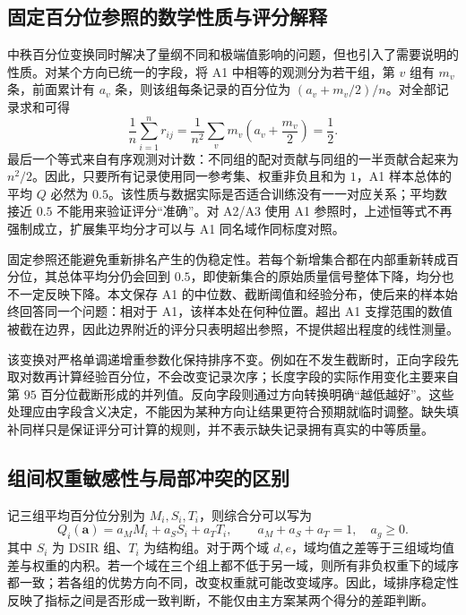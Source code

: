 \subsection{固定百分位参照的数学性质与评分解释}
中秩百分位变换同时解决了量纲不同和极端值影响的问题，但也引入了需要说明的性质。对某个方向已统一的字段，将 A1 中相等的观测分为若干组，第 $v$ 组有 $m_v$ 条，前面累计有 $a_v$ 条，则该组每条记录的百分位为 $(a_v+m_v/2)/n$。对全部记录求和可得
\begin{equation}
\frac{1}{n}\sum_{i=1}^{n}r_{ij}
=\frac{1}{n^2}\sum_v m_v\left(a_v+\frac{m_v}{2}\right)
=\frac12.
\label{eq:q1-rank-mean}
\end{equation}
最后一个等式来自有序观测对计数：不同组的配对贡献与同组的一半贡献合起来为 $n^2/2$。因此，只要所有记录使用同一参考集、权重非负且和为 $1$，A1 样本总体的平均 $Q$ 必然为 $0.5$。该性质与数据实际是否适合训练没有一一对应关系；平均数接近 $0.5$ 不能用来验证评分“准确”。对 A2/A3 使用 A1 参照时，上述恒等式不再强制成立，扩展集平均分才可以与 A1 同名域作同标度对照。

固定参照还能避免重新排名产生的伪稳定性。若每个新增集合都在内部重新转成百分位，其总体平均分仍会回到 $0.5$，即使新集合的原始质量信号整体下降，均分也不一定反映下降。本文保存 A1 的中位数、截断阈值和经验分布，使后来的样本始终回答同一个问题：相对于 A1，该样本处在何种位置。超出 A1 支撑范围的数值被截在边界，因此边界附近的评分只表明超出参照，不提供超出程度的线性测量。

该变换对严格单调递增重参数化保持排序不变。例如在不发生截断时，正向字段先取对数再计算经验百分位，不会改变记录次序；长度字段的实际作用变化主要来自第 $95$ 百分位截断形成的并列值。反向字段则通过方向转换明确“越低越好”。这些处理应由字段含义决定，不能因为某种方向让结果更符合预期就临时调整。缺失填补同样只是保证评分可计算的规则，并不表示缺失记录拥有真实的中等质量。

\subsection{组间权重敏感性与局部冲突的区别}
记三组平均百分位分别为 $M_i,S_i,T_i$，则综合分可以写为
\begin{equation}
Q_i(\bm a)=a_M M_i+a_S S_i+a_T T_i,
\qquad a_M+a_S+a_T=1,\quad a_g\geq0.
\label{eq:q1-group-score}
\end{equation}
其中 $S_i$ 为 DSIR 组、$T_i$ 为结构组。对于两个域 $d,e$，域均值之差等于三组域均值差与权重的内积。若一个域在三个组上都不低于另一域，则所有非负权重下的域序都一致；若各组的优势方向不同，改变权重就可能改变域序。因此，域排序稳定性反映了指标之间是否形成一致判断，不能仅由主方案某两个得分的差距判断。

